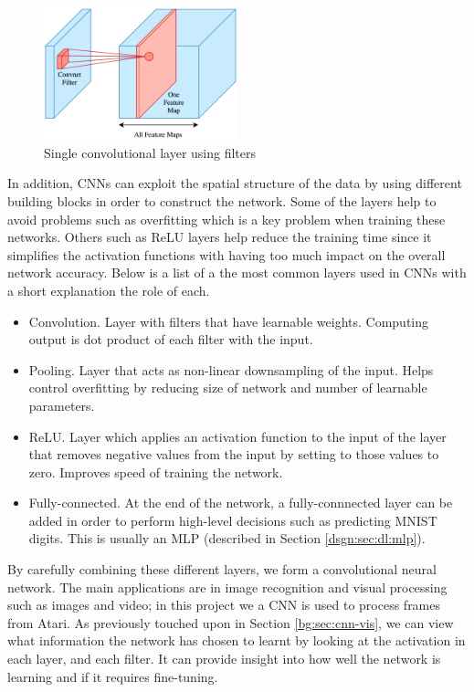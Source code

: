 \begin{figure}[htbp]
	\centering
	\includegraphics[width=0.5\textwidth]{chapters/chapter3/images/cnn.png}
	\caption{Single convolutional layer using filters
		\label{fig:single-cnn-layer}
	}
\end{figure}

In addition, CNNs can exploit the spatial structure of the data by using different building blocks in order to construct the network. Some of the layers help to avoid problems such as overfitting which is a key problem when training these networks. Others such as ReLU layers help reduce the training time since it simplifies the activation functions with having too much impact on the overall network accuracy. Below is a list of a the most common layers used in CNNs with a short explanation the role of each.

\begin{itemize}
	\item Convolution. Layer with filters that have learnable weights. Computing output is dot product of each filter with the input.
	\item Pooling. Layer that acts as non-linear downsampling of the input. Helps control overfitting by reducing size of network and number of learnable parameters.
	\item ReLU. Layer which applies an activation function to the input of the layer that removes negative values from the input by setting to those values to zero. \cite{Romanuke2017} Improves speed of training the network.
	\item Fully-connected. At the end of the network, a fully-connnected layer can be added in order to perform high-level decisions such as predicting MNIST digits. This is usually an MLP (described in Section \ref{dsgn:sec:dl:mlp}).
\end{itemize}

By carefully combining these different layers, we form a convolutional neural network. The main applications are in image recognition and visual processing such as images and video; in this project we a CNN is used to process frames from Atari. As previously touched upon in Section \ref{bg:sec:cnn-vis}, we can view what information the network has chosen to learnt by looking at the activation in each layer, and each filter. It can provide insight into how well the network is learning and if it requires fine-tuning.


